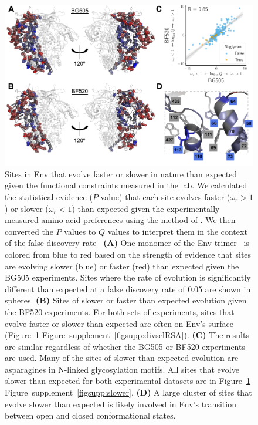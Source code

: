 \documentclass[9pt]{elife}
\begin{document}
\begin{figure}
\includegraphics[width=1.0\textwidth]{figures/omegabysite_structural_analysis/omegabysite_structural_analysis.pdf}
\caption{\label{fig:divsel}
Sites in Env that evolve faster or slower in nature than expected given the functional constraints measured in the lab.
We calculated the statistical evidence ($P$ value) that each site evolves faster ($\omega_r > 1$) or slower ($\omega_r < 1$) than expected given the experimentally measured amino-acid preferences using the method of \citet{bloom2017identification}.
We then converted the $P$ values to $Q$ values to interpret them in the context of the false discovery rate~\citep{storey2003statistical}
{\bf (A)}
One monomer of the Env trimer~\citep[PDB 5FYL;][]{stewart2016trimeric} is colored from blue to red based on the strength of evidence that sites are evolving slower (blue) or faster (red) than expected given the BG505 experiments.
Sites where the rate of evolution is significantly different than expected at a false discovery rate of 0.05 are shown in spheres.
{\bf (B)}
Sites of slower or faster than expected evolution given the BF520 experiments.
For both sets of experiments, sites that evolve faster or slower than expected are often on Env's surface (Figure~\ref{fig:divsel}-Figure~supplement~\ref{figsupp:divselRSA}).
{\bf (C)}
The results are similar regardless of whether the BG505 or BF520 experiments are used.
Many of the sites of slower-than-expected evolution are asparagines in N-linked glycosylation motifs.
All sites that evolve slower than expected for both experimental datasets are in Figure~\ref{fig:divsel}-Figure~supplement~\ref{figsupp:slower}.
{\bf (D)} 
A large cluster of sites that evolve slower than expected is likely involved in Env's transition between open and closed conformational states.
}
\end{figure}
\end{document}
